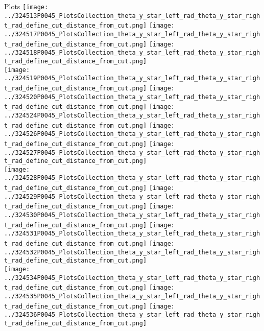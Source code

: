 \documentclass{beamer}
\begin{document}
\begin{frame}
\begin{block}{Plots}
                \texttt{[image: ../324513P0045\_PlotsCollection\_theta\_y\_star\_left\_rad\_theta\_y\_star\_right\_rad\_define\_cut\_distance\_from\_cut.png]}
                \texttt{[image: ../324517P0045\_PlotsCollection\_theta\_y\_star\_left\_rad\_theta\_y\_star\_right\_rad\_define\_cut\_distance\_from\_cut.png]}
                \texttt{[image: ../324518P0045\_PlotsCollection\_theta\_y\_star\_left\_rad\_theta\_y\_star\_right\_rad\_define\_cut\_distance\_from\_cut.png]}\\
                \texttt{[image: ../324519P0045\_PlotsCollection\_theta\_y\_star\_left\_rad\_theta\_y\_star\_right\_rad\_define\_cut\_distance\_from\_cut.png]}
                \texttt{[image: ../324520P0045\_PlotsCollection\_theta\_y\_star\_left\_rad\_theta\_y\_star\_right\_rad\_define\_cut\_distance\_from\_cut.png]}
                \texttt{[image: ../324524P0045\_PlotsCollection\_theta\_y\_star\_left\_rad\_theta\_y\_star\_right\_rad\_define\_cut\_distance\_from\_cut.png]}
                \texttt{[image: ../324526P0045\_PlotsCollection\_theta\_y\_star\_left\_rad\_theta\_y\_star\_right\_rad\_define\_cut\_distance\_from\_cut.png]}
                \texttt{[image: ../324527P0045\_PlotsCollection\_theta\_y\_star\_left\_rad\_theta\_y\_star\_right\_rad\_define\_cut\_distance\_from\_cut.png]}\\
                \texttt{[image: ../324528P0045\_PlotsCollection\_theta\_y\_star\_left\_rad\_theta\_y\_star\_right\_rad\_define\_cut\_distance\_from\_cut.png]}
                \texttt{[image: ../324529P0045\_PlotsCollection\_theta\_y\_star\_left\_rad\_theta\_y\_star\_right\_rad\_define\_cut\_distance\_from\_cut.png]}
                \texttt{[image: ../324530P0045\_PlotsCollection\_theta\_y\_star\_left\_rad\_theta\_y\_star\_right\_rad\_define\_cut\_distance\_from\_cut.png]}
                \texttt{[image: ../324531P0045\_PlotsCollection\_theta\_y\_star\_left\_rad\_theta\_y\_star\_right\_rad\_define\_cut\_distance\_from\_cut.png]}
                \texttt{[image: ../324532P0045\_PlotsCollection\_theta\_y\_star\_left\_rad\_theta\_y\_star\_right\_rad\_define\_cut\_distance\_from\_cut.png]}\\
                \texttt{[image: ../324534P0045\_PlotsCollection\_theta\_y\_star\_left\_rad\_theta\_y\_star\_right\_rad\_define\_cut\_distance\_from\_cut.png]}
                \texttt{[image: ../324535P0045\_PlotsCollection\_theta\_y\_star\_left\_rad\_theta\_y\_star\_right\_rad\_define\_cut\_distance\_from\_cut.png]}
                \texttt{[image: ../324536P0045\_PlotsCollection\_theta\_y\_star\_left\_rad\_theta\_y\_star\_right\_rad\_define\_cut\_distance\_from\_cut.png]}


\end{block}
\end{frame}
\end{document}
